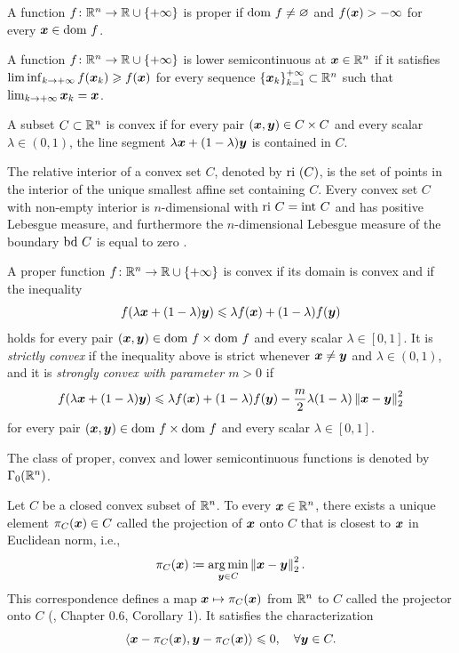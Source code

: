 \begin{defn} \label{def:domains_prop}
A function $f\colon\mathbb{R}^n\to\mathbb{R}\cup\{+\infty\}$ is proper if $\mathrm{dom~} f \neq \varnothing$ and $f(\boldsymbol{x}) > -\infty$ for every $\boldsymbol{x} \in \mathrm{dom~} f$. 

A function $f\colon\mathbb{R}^n\to\mathbb{R}\cup\{+\infty\}$ is lower semicontinuous at $\boldsymbol{x}\in\mathbb{R}^n$ if it satisfies $\liminf_{k\to+\infty}f(\boldsymbol{x}_{k})\geqslant f(\boldsymbol{x})$ for every sequence $\left\{ \boldsymbol{x}_{k}\right\} _{k=1}^{+\infty}\subset\mathbb{R}^n$ such that $\lim_{k\to+\infty}\boldsymbol{x}_{k}=\boldsymbol{x}$.
\end{defn}
%
\begin{defn} \label{def:convex_sets}
A subset $C\subset\mathbb{R}^n$ is convex if for every pair $(\boldsymbol{x},\boldsymbol{y}) \in C \times C$ and every scalar $\lambda \in (0,1)$, the line segment $\lambda\boldsymbol{x}+(1-\lambda)\boldsymbol{y}$ is contained in $C$.

The relative interior of a convex set $C$, denoted by $\mathrm{ri~}(C)$, is the set of points in the interior of the unique smallest affine set containing $C$. Every convex set $C$ with non-empty interior is $n$-dimensional with $\mathrm{ri~} C=\mathrm{int~} C$ and has positive Lebesgue measure, and furthermore the $n$-dimensional Lebesgue measure of the boundary $\mathrm{bd~} C$ is equal to zero \cite{lang1986note}.
\end{defn}
%
\begin{defn} \label{def:convex} 
A proper function $f\colon\mathbb{R}^n\to\mathbb{R}\cup\{+\infty\}$ is convex if its domain is convex and if the inequality
\[
f(\lambda\boldsymbol{x}+(1-\lambda)\boldsymbol{y})\leqslant\lambda f(\boldsymbol{x})+(1-\lambda)f(\boldsymbol{y})
\]
holds for every pair $(\boldsymbol{x},\boldsymbol{y}) \in \mathrm{dom~} f \times \mathrm{dom~} f$ and every scalar $\lambda\in[0,1]$. It is \textit{strictly convex} if the inequality above is strict whenever $\boldsymbol{x}\neq\boldsymbol{y}$ and $\lambda \in (0,1)$, and it is \textit{strongly convex with parameter $m>0$} if 
\[
f(\lambda\boldsymbol{x}+(1-\lambda)\boldsymbol{y})\leqslant\lambda f(\boldsymbol{x})+(1-\lambda)f(\boldsymbol{y})-\frac{m}{2}\lambda(1-\lambda)\left\Vert \boldsymbol{x}-\boldsymbol{y}\right\Vert _{2}^{2}
\]
for every pair $(\boldsymbol{x},\boldsymbol{y}) \in \mathrm{dom~} f \times \mathrm{dom~} f$ and every scalar $\lambda\in[0,1]$.

The class of proper, convex and lower semicontinuous functions is denoted by $\Gamma_0(\mathbb{R}^n)$.
\end{defn}
%
\begin{defn}[Projections] \label{def:projections} 
Let $C$ be a closed convex subset of $\mathbb{R}^n$. To every $\boldsymbol{x} \in \mathbb{R}^n$, there exists a unique element $\pi_{C}(\boldsymbol{x}) \in C$ called the projection of $\boldsymbol{x}$ onto $C$ that is closest to $\boldsymbol{x}$ in Euclidean norm, i.e.,
\begin{equation} \label{eq:proj_def}
\pi_{C}(\boldsymbol{x})\coloneqq\operatorname*{arg\,min}_{\boldsymbol{y}\in C}\left\Vert \boldsymbol{x}-\boldsymbol{y}\right\Vert _{2}^{2}.
\end{equation}
This correspondence defines a map $\boldsymbol{x} \mapsto \pi_{C}(\boldsymbol{x})$ from $\mathbb{R}^n$ to $C$ called the projector onto $C$ (\cite{aubin2012differential}, Chapter 0.6, Corollary 1). It satisfies the characterization
\begin{equation} \label{eq:proj_char}
\left\langle \boldsymbol{x}-\pi_{C}(\boldsymbol{x}),\boldsymbol{y}-\pi_{C}(\boldsymbol{x})\right\rangle \leqslant0, \quad\forall\boldsymbol{y}\in C.
\end{equation}
\end{defn}
